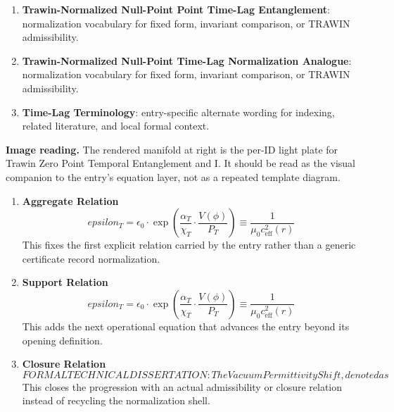 \begin{enumerate}[leftmargin=1.6em,itemsep=6pt,topsep=4pt]
\item \textbf{Trawin-Normalized Null-Point Point Time-Lag Entanglement}: normalization vocabulary for fixed form, invariant comparison, or TRAWIN admissibility.
\item \textbf{Trawin-Normalized Null-Point Time-Lag Normalization Analogue}: normalization vocabulary for fixed form, invariant comparison, or TRAWIN admissibility.
\item \textbf{Time-Lag Terminology}: entry-specific alternate wording for indexing, related literature, and local formal context.
\end{enumerate}

\begin{samepage}
\noindent\begin{minipage}[t]{0.45\linewidth}
\vspace{0pt}
\raggedright
\scriptsize\textbf{Image reading.} The rendered manifold at right is the per-ID light plate for Trawin Zero Point Temporal Entanglement and I. It should be read as the visual companion to the entry's equation layer, not as a repeated template diagram.\par
\end{minipage}\hfill
\begin{minipage}[t]{0.53\linewidth}
\vspace*{-0.10in}
\raggedright
{}
\end{minipage}
\end{samepage}

\clearpage


\begin{enumerate}[leftmargin=1.6em,itemsep=9pt,topsep=6pt]
\item \textbf{Aggregate Relation}
\[
epsilon_T = \epsilon_0 \cdot \exp\left( \frac{\alpha_T}{\chi_T} \cdot \frac{V(\phi)}{P_T} \right) \equiv \frac{1}{\mu_0 c_{\text{eff}}^2(r)}
\]
This fixes the first explicit relation carried by the entry rather than a generic certificate record normalization.

\item \textbf{Support Relation}
\[
epsilon_T = \epsilon_0 \cdot \exp\left( \frac{\alpha_T}{\chi_T} \cdot \frac{V(\phi)}{P_T} \right) \equiv \frac{1}{\mu_0 c_{\text{eff}}^2(r)}
\]
This adds the next operational equation that advances the entry beyond its opening definition.

\item \textbf{Closure Relation}
\[
FORMAL TECHNICAL DISSERTATION:The Vacuum Permittivity Shift, denoted as
\]
This closes the progression with an actual admissibility or closure relation instead of recycling the normalization shell.
\end{enumerate}

